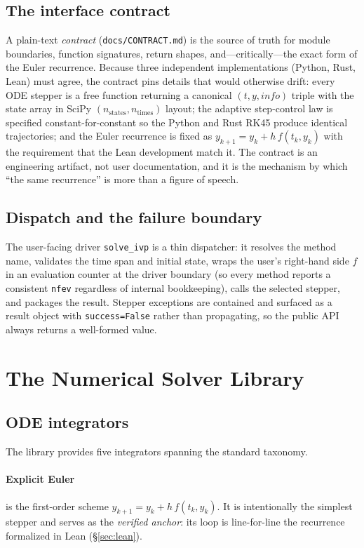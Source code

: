 \documentclass[sigplan,nonacm,screen]{acmart}
\begin{document}
\subsection{The interface contract}
A plain-text \emph{contract} (\texttt{docs/CONTRACT.md}) is the source of truth
for module boundaries, function signatures, return shapes, and---critically---the
exact form of the Euler recurrence. Because three independent implementations
(Python, Rust, Lean) must agree, the contract pins details that would otherwise
drift: every ODE stepper is a free function returning a canonical
$(t, y, \mathit{info})$ triple with the state array in SciPy
$(n_\text{states}, n_\text{times})$ layout; the adaptive step-control law is
specified constant-for-constant so the Python and Rust RK45 produce identical
trajectories; and the Euler recurrence is fixed as
$y_{k+1} = y_k + h\,f(t_k, y_k)$ with the requirement that the Lean development
match it. The contract is an engineering artifact, not user documentation, and it
is the mechanism by which ``the same recurrence'' is more than a figure of
speech.

\subsection{Dispatch and the failure boundary}
The user-facing driver \texttt{solve\_ivp} is a thin dispatcher: it resolves the
method name, validates the time span and initial state, wraps the user's
right-hand side $f$ in an evaluation counter at the driver boundary (so every
method reports a consistent \texttt{nfev} regardless of internal bookkeeping),
calls the selected stepper, and packages the result. Stepper exceptions are
contained and surfaced as a result object with \texttt{success=False} rather than
propagating, so the public API always returns a well-formed value.

\section{The Numerical Solver Library}
\label{sec:lib}

\subsection{ODE integrators}
The library provides five integrators spanning the standard taxonomy.

\paragraph{Explicit Euler} is the first-order scheme
$y_{k+1} = y_k + h\,f(t_k, y_k)$. It is intentionally the simplest stepper and
serves as the \emph{verified anchor}: its loop is line-for-line the recurrence
formalized in Lean (\S\ref{sec:lean}).
\end{document}
